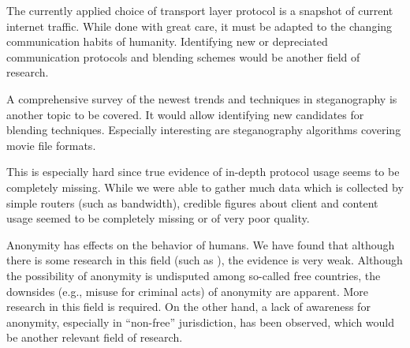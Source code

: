 The currently applied choice of transport layer protocol is a snapshot of current internet traffic. While done with great care, it must be adapted to the changing communication habits of humanity. Identifying new or depreciated communication protocols and blending schemes would be another field of research.

A comprehensive survey of the newest trends and techniques in steganography is another topic to be covered. It would allow identifying new candidates for blending techniques. Especially interesting are steganography algorithms covering movie file formats.

This is especially hard since true evidence of in-depth protocol usage seems to be completely missing. While we were able to gather much data which is collected by simple routers (such as bandwidth), credible figures about client and content usage seemed to be completely missing or of very poor quality.

Anonymity has effects on the behavior of humans. We have found that although there is some research in this field (such as \cite{postmes2001social}), the evidence is very weak. Although the possibility of anonymity is undisputed among so-called free countries, the downsides (e.g., misuse for criminal acts) of anonymity are apparent. More research in this field is required. On the other hand, a lack of awareness for anonymity, especially in ``non-free'' jurisdiction, has been observed, which would be another relevant field of research. 
